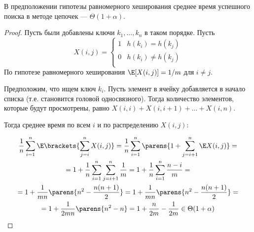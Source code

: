 \begin{theorem}
    В предположении гипотезы равномерного хеширования
    среднее время успешного поиска в методе цепочек
    --- $\Theta(1 + \alpha)$.
\end{theorem}
\begin{proof}
    Пусть были добавлены ключи $k_1, \ldots, k_n$
    в таком порядке.
    Пусть
    \[
        X(i, j) =
        \begin{cases}
            1 & h(k_i) = h(k_j) \\
            0 & h(k_i) \ne h(k_j) \\
        \end{cases}
    \]
    По гипотезе равномерного хеширования
    $\E[X(i, j)] = 1/m$ для $i \ne j$.

    Предположим, что ищем ключ $k_i$.
    Пусть элемент в ячейку добавляется в начало списка
    (т.е. становится головой односвязного).
    Тогда количество элементов,
    которые будут просмотрены,
    равно $X(i, i) + X(i, i + 1) + \ldots + X(i, n)$.

    Тогда среднее время по всем $i$ и по
    распределению $X(i, j)$:

    \begin{gather*}
        \frac{1}{n} \sum_{i=1}^n \E \brackets{\sum_{j=i}^n X(i, j)}
        = \frac{1}{n} \sum_{i=1}^n \parens{1 + \sum_{j = i + 1}^n \E X(i, j)} = \\
        = 1 + \frac{1}{n} \sum_{i=1}^n \sum_{j = i + 1}^n \frac{1}{m}
        = 1 + \frac{1}{n} \sum_{i=1}^n \frac{n - i}{m} = \\
        = 1 + \frac{1}{mn} \parens{n^2 - \frac{n (n + 1)}{2}}
        = 1 + \frac{1}{mn} \parens{n^2 - \frac{n (n + 1)}{2}} = \\
        = 1 + \frac{1}{2mn} \parens{n^2 - n}
        = 1 + \frac{n}{2m} - \frac{1}{2m} \in \Theta(1 + \alpha)
    \end{gather*}
\end{proof}
